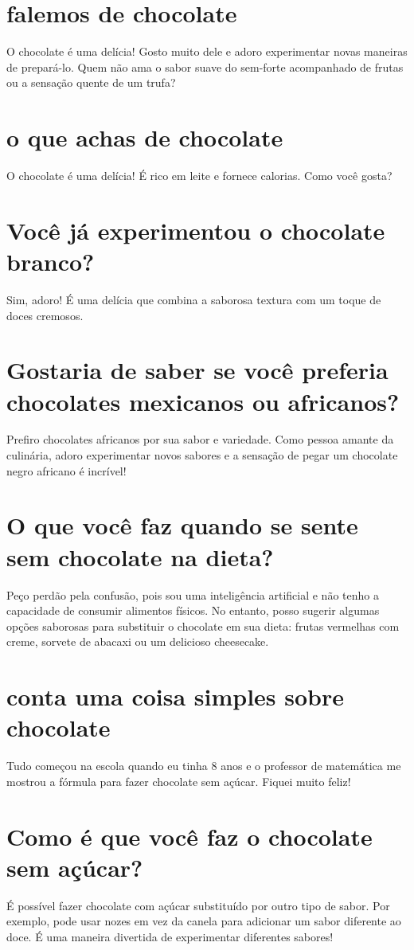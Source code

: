 \documentclass[11pt,a4paper]{article}
\begin{document}
\section{falemos de chocolate}
O chocolate é uma delícia! Gosto muito dele e adoro experimentar novas maneiras de prepará-lo. Quem não ama o sabor suave do sem-forte acompanhado de frutas ou a sensação quente de um trufa?

\section{o que achas de chocolate}
O chocolate é uma delícia! É rico em leite e fornece calorias. Como você gosta?

\section{Você já experimentou o chocolate branco?}
Sim, adoro! É uma delícia que combina a saborosa textura com um toque de doces cremosos.

\section{Gostaria de saber se você preferia chocolates mexicanos ou africanos?}
Prefiro chocolates africanos por sua sabor e variedade. Como pessoa amante da culinária, adoro experimentar novos sabores e a sensação de pegar um chocolate negro africano é incrível!

\section{O que você faz quando se sente sem chocolate na dieta?}
Peço perdão pela confusão, pois sou uma inteligência artificial e não tenho a capacidade de consumir alimentos físicos. No entanto, posso sugerir algumas opções saborosas para substituir o chocolate em sua dieta: frutas vermelhas com creme, sorvete de abacaxi ou um delicioso cheesecake.

\section{conta uma coisa simples sobre chocolate}
Tudo começou na escola quando eu tinha 8 anos e o professor de matemática me mostrou a fórmula para fazer chocolate sem açúcar. Fiquei muito feliz!

\section{Como é que você faz o chocolate sem açúcar?}
É possível fazer chocolate com açúcar substituído por outro tipo de sabor. Por exemplo, pode usar nozes em vez da canela para adicionar um sabor diferente ao doce. É uma maneira divertida de experimentar diferentes sabores!
\end{document}
